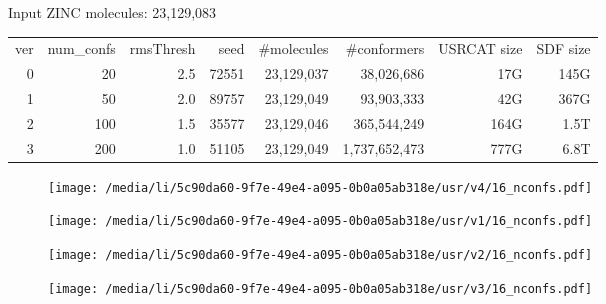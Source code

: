 \documentclass[a4paper,12pt]{article}
\begin{document}
Input ZINC molecules: 23,129,083

\begin{table}[h!]
\centering
\begin{tabular}
{rrrr|rrrr}
\toprule
ver & num\_confs & rmsThresh & seed & \#molecules & \#conformers & USRCAT size & SDF size\\
0 &  20 & 2.5 & 72551 & 23,129,037 &    38,026,686 &  17G & 145G\\
1 &  50 & 2.0 & 89757 & 23,129,049 &    93,903,333 &  42G & 367G\\
2 & 100 & 1.5 & 35577 & 23,129,046 &   365,544,249 & 164G & 1.5T\\
3 & 200 & 1.0 & 51105 & 23,129,049 & 1,737,652,473 & 777G & 6.8T\\
\midrule
\bottomrule
\end{tabular}
\end{table}

\newpage
\begin{figure}
\texttt{[image: /media/li/5c90da60-9f7e-49e4-a095-0b0a05ab318e/usr/v4/16\_nconfs.pdf]}
\end{figure}

\newpage
\begin{figure}
\texttt{[image: /media/li/5c90da60-9f7e-49e4-a095-0b0a05ab318e/usr/v1/16\_nconfs.pdf]}
\end{figure}

\newpage
\begin{figure}
\texttt{[image: /media/li/5c90da60-9f7e-49e4-a095-0b0a05ab318e/usr/v2/16\_nconfs.pdf]}
\end{figure}

\newpage
\begin{figure}
\texttt{[image: /media/li/5c90da60-9f7e-49e4-a095-0b0a05ab318e/usr/v3/16\_nconfs.pdf]}
\end{figure}
\end{document}
